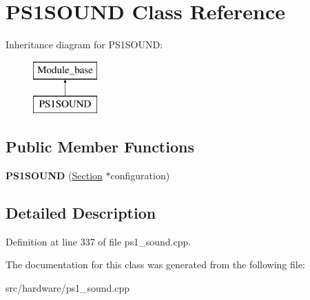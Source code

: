 \hypertarget{classPS1SOUND}{\section{P\-S1\-S\-O\-U\-N\-D Class Reference}
\label{classPS1SOUND}
}
Inheritance diagram for P\-S1\-S\-O\-U\-N\-D\-:\begin{figure}[H]
\begin{center}
\leavevmode
\includegraphics[height=2.000000cm]{classPS1SOUND}
\end{center}
\end{figure}
\subsection*{Public Member Functions}
\begin{DoxyCompactItemize}
\item 
\hypertarget{classPS1SOUND_a0f344bb539a95ca1f5036ba76cc6a5eb}{{\bfseries P\-S1\-S\-O\-U\-N\-D} (\hyperlink{classSection}{Section} $\ast$configuration)}\label{classPS1SOUND_a0f344bb539a95ca1f5036ba76cc6a5eb}

\end{DoxyCompactItemize}


\subsection{Detailed Description}


Definition at line 337 of file ps1\-\_\-sound.\-cpp.



The documentation for this class was generated from the following file\-:\begin{DoxyCompactItemize}
\item 
src/hardware/ps1\-\_\-sound.\-cpp\end{DoxyCompactItemize}
